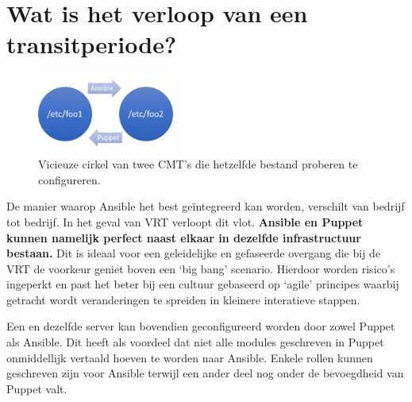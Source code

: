 \section{Wat is het verloop van een transitperiode?}




\begin{figure}
\centering
\includegraphics[width=0.4\textwidth]{img/vicieuzecirkel.PNG}
\caption{\label{fig:vicieuzecirkel}Vicieuze cirkel van twee \gls{CMT}'s die hetzelfde bestand proberen te configureren.}
\end{figure}

De manier waarop Ansible het best ge\"integreerd kan worden, verschilt van bedrijf tot bedrijf. In het geval van \gls{VRT} verloopt dit vlot. \textbf{Ansible en Puppet kunnen namelijk perfect naast elkaar in dezelfde infrastructuur bestaan.} Dit is ideaal voor een geleidelijke en gefaseerde overgang die bij de \gls{VRT} de voorkeur geniet boven een `big bang' scenario. Hierdoor worden risico's ingeperkt en past het beter bij een cultuur gebaseerd op `agile' principes waarbij getracht wordt veranderingen te spreiden in kleinere interatieve stappen. 

Een en dezelfde server kan bovendien geconfigureerd worden door zowel Puppet als Ansible. Dit heeft als voordeel dat niet alle modules geschreven in Puppet onmiddellijk vertaald hoeven te worden naar Ansible. Enkele rollen kunnen geschreven zijn voor Ansible terwijl een ander deel nog onder de bevoegdheid van Puppet valt.

